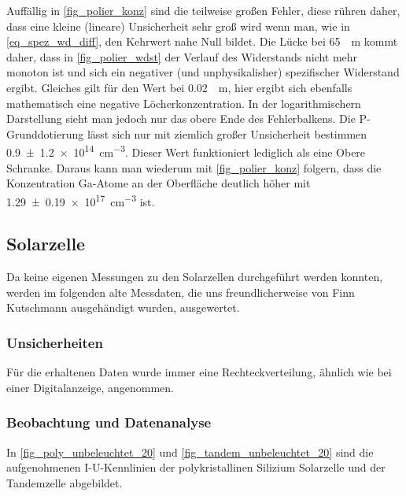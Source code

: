 \documentclass[
	a4paper,
	12pt,
	pagesize,
	ngerman
]{scrartcl}
\begin{document}
	Auffällig in \cref{fig_polier_konz} sind die teilweise großen Fehler, diese rühren daher, dass eine kleine (lineare) Unsicherheit sehr groß wird wenn man, wie in \cref{eq_spez_wd_diff}, den Kehrwert nahe Null bildet.
	Die Lücke bei \SI{65}{\mu m} kommt daher, dass in \cref{fig_polier_wdst} der Verlauf des Widerstands nicht mehr monoton ist und sich ein negativer (und unphysikalisher) spezifischer Widerstand ergibt.
	Gleiches gilt für den Wert bei \SI{0.02}{\mu m}, hier ergibt sich ebenfalls mathematisch eine negative Löcherkonzentration.
	In der logarithmischern Darstellung sieht man jedoch nur das obere Ende des Fehlerbalkens.
	Die P-Grunddotierung lässt sich nur mit ziemlich großer Unsicherheit bestimmen \SI{0.9+-1.2e14}{cm^{-3}}.
	Dieser Wert funktioniert lediglich als eine Obere Schranke.
	Daraus kann man wiederum mit \cref{fig_polier_konz} folgern, dass die Konzentration Ga-Atome an der Oberfläche deutlich höher mit \SI{1.29+-0.19e17}{cm^{-3}} ist.

	\subsection{Solarzelle}

	Da keine eigenen Messungen zu den Solarzellen durchgeführt werden konnten, werden im folgenden alte Messdaten, die uns freundlicherweise von Finn Kutschmann ausgehändigt wurden, ausgewertet.
	\subsubsection{Unsicherheiten}
	Für die erhaltenen Daten wurde immer eine Rechteckverteilung, ähnlich wie bei einer Digitalanzeige, angenommen.
	\subsubsection{Beobachtung und Datenanalyse}

	In \cref{fig_poly_unbeleuchtet_20} und \cref{fig_tandem_unbeleuchtet_20} sind die aufgenohmenen I-U-Kennlinien der polykristallinen Silizium Solarzelle und der Tandemzelle abgebildet.
\end{document}
